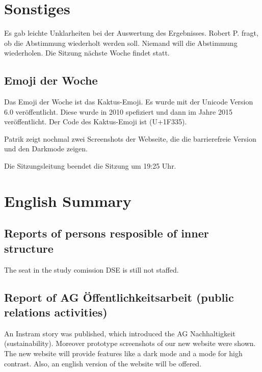 \documentclass{fsrprotokoll}
\begin{document}
 \begin{vote-two-thirds}
   \voteMoney{}  %
\end{vote-two-thirds}

\section{Sonstiges}
Es gab leichte Unklarheiten bei der Auswertung des Ergebnisses. Robert P. fragt, ob die Abstimmung wiederholt werden soll. Niemand will die Abstimmung wiederholen. Die Sitzung nächste Woche findet statt.

\subsection{Emoji der Woche}
Das Emoji der Woche ist das Kaktus-Emoji. Es wurde mit der Unicode Version 6.0 veröffentlicht. Diese wurde in 2010 spefiziert und dann im Jahre 2015 veröffentlicht. Der Code des Kaktus-Emoji ist (U+1F335).

Patrik zeigt nochmal zwei Screenshots der Webseite, die die barrierefreie Version und den Darkmode zeigen.

Die Sitzungsleitung beendet die Sitzung um 19:25 Uhr.
\section*{English Summary}
\subsection{Reports of persons resposible of inner structure}
The seat in the study comission DSE is still not staffed.

\subsection{Report of AG Öffentlichkeitsarbeit (public relations activities)}
An Instram story was published, which introduced the AG Nachhaltigkeit (sustainability). Moreover prototype screenshots of our new website were shown. The new website will provide features like a dark mode and a mode for high contrast. Also, an english version of the website will be offered.
\end{document}
